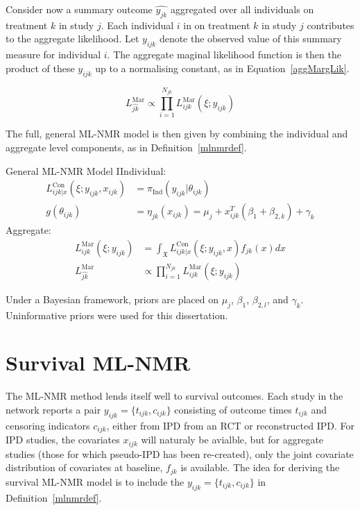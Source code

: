 Consider now a summary outcome $\hat{y_{jk}}$ aggregated over all individuals on treatment $k$ in study $j$. Each individual $i$ in on treatment $k$ in study $j$ contributes to the aggregate likelihood. Let $y_{ijk}$ denote the observed value of this summary measure for individual $i$. The aggregate maginal likelihood function is then the product of these $y_{ijk}$ up to a normalising constant, as in Equation~\ref{aggMargLik}.

\begin{equation}
    L_{\hat{jk}}^{\text{Mar}} \propto \prod_{i = 1}^{N_{jk}}L_{ijk}^{\text{Mar}}(\xi; y_{ijk})
    \label{aggMargLik}
\end{equation}

The full, general ML-NMR model is then given by combining the individual and aggregate level components, as in Definition~\ref{mlnmrdef}.

\begin{definition}[label=mlnmrdef]{General ML-NMR Model}
    IIndividual:
    \begin{align}
        L_{ijk|x}^{\text{Con}}(\xi;y_{ijk},x_{ijk}) &= \pi_{\text{Ind}}(y_{ijk}|\theta_{ijk}) \\
        g(\theta_{ijk}) &= \eta_{jk}(x_{ijk}) = \mu_j + x_{ijk}^T(\beta_1 + \beta_{2,k}) + \gamma_k \label{mlnmragg}
    \end{align}
    Aggregate:
    \begin{align}
        L_{ijk}^{\text{Mar}}(\xi; y_{ijk}) &= \int_{\mathfrak{X}} L_{ijk|x}^{\text{Con}}(\xi; y_{ijk}, x)f_{jk}(x)dx \label{mlnnmrint}\\
        L_{\hat{jk}}^{\text{Mar}} &\propto \prod_{i = 1}^{N_{jk}}L_{ijk}^{\text{Mar}}(\xi; y_{ijk})
    \end{align}
\end{definition}

Under a Bayesian framework, priors are placed on $\mu_j$, $\beta_1$, $\beta_{2,l}$, and $\gamma_k$. Uninformative priors were used for this dissertation.

\section{Survival ML-NMR}
The ML-NMR method lends itself well to survival outcomes. Each study in the network reports a pair $y_{ijk} = \{t_{ijk}, c_{ijk}\}$ consisting of outcome times $t_{ijk}$ and censoring indicators $c_{ijk}$, either from IPD from an RCT or reconstructed IPD. For IPD studies, the covariates $x_{ijk}$ will naturaly be avialble, but for aggregate studies (those for which pseudo-IPD has been re-created), only the joint covariate distribution of covariates at baseline, $f_{jk}$ is available. The idea for deriving the survival ML-NMR model is to include the $y_{ijk} = \{t_{ijk}, c_{ijk}\}$ in Definition~\ref{mlnmrdef}. \\

